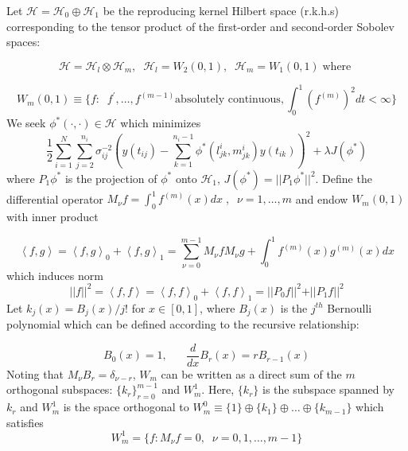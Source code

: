 \documentclass[12pt]{article}
\theoremstyle{definition}
\begin{document}
Let $\mathcal{H} = \mathcal{H}_{0} \oplus \mathcal{H}_{1}$ be the reproducing kernel Hilbert space (r.k.h.s) corresponding to the tensor product of the first-order and second-order Sobolev spaces:

\[
\mathcal{H} = \mathcal{H}_{l} \otimes \mathcal{H}_{m}, \;\; \mathcal{H}_{l} = W_2\left(0,1\right),\;\;\mathcal{H}_{m} = W_1\left(0,1\right)\;\mbox{where }
\]

\[W_m\left(0,1\right) \equiv \lbrace f: \;\;f^\prime, \dots, f^{\left( m-1 \right)} \mbox{absolutely continuous}, \int_0^1 \left(f^{\left( m \right)}\right)^2 dt < \infty \rbrace\]
\noindent
We seek $\phi^*\left(\cdot, \cdot \right) \in \mathcal{H}$ which minimizes
\begin{equation}
\frac{1}{2}\sum_{i=1}^N \sum_{j=2}^{n_i} {\sigma^{-2}_{ij}}\left( y\left(t_{ij}\right) - \sum_{k=1}^{n_i - 1}\phi^*\left(l^i_{jk},m^i_{jk} \right)y\left(t_{ik}\right) \right)^2 + \lambda J\left(\phi^*\right)  
\label{eq:objectivefun}
\end{equation}
\noindent
where $P_1 \phi^*$ is the projection of $\phi^*$ onto $\mathcal{H}_1$, $J\left(\phi^*\right) = \vert \vert P_1 \phi^* \vert \vert^2$. Define the differential operator $M_\nu f = \int_0^1 f^{\left( m \right)}\left(x\right) dx\;,\;\; \nu = 1, \dots, m$ and endow $W_m\left(0,1\right)$ with inner product

\begin{equation}
\left< f,g\right> = \left< f,g\right>_0 + \left< f,g\right>_1 = \sum_{\nu=0}^{m-1} M_\nu f M_\nu g + \int_0^1 f^{\left( m \right)}\left(x\right)g^{\left( m \right)}\left(x\right)dx
\end{equation}
\noindent
which induces norm 
\[
\vert \vert f \vert \vert^2 = \left< f,f\right> = \left< f,f\right>_0 + \left< f,f\right>_1 = \vert \vert P_0 f \vert \vert^2 + \vert \vert P_1 f \vert \vert^2
\]
\noindent
Let $k_j\left(x\right) = B_j\left(x\right)/{j!}$ for $x \in \left[0,1\right]$, where $B_j\left(x\right)$ is the $j^{th}$ Bernoulli polynomial which can be defined according to the recursive relationship:

\[
B_0\left(x\right) = 1,\;\;\;\;\;\; \frac{d}{dx} B_r\left(x\right) = rB_{r-1}\left(x\right)
\]
\noindent
Noting that $M_\nu B_r = \delta_{\nu-r}$, $W_m$ can be written as a direct sum of the $m$ orthogonal subspaces: $\lbrace k_r \rbrace_{r=0}^{m-1}$ and $W_m^1$.   Here, $\lbrace k_r \rbrace$ is the subspace spanned by $k_r$ and $W_m^1$ is the space orthogonal to $W_m^0 \equiv \lbrace 1 \rbrace \oplus \lbrace k_1 \rbrace \oplus \dots \oplus \lbrace k_{m-1} \rbrace$ which satisfies 
\[
W_m^1 = \lbrace f: M_\nu f = 0,\;\; \nu = 0,1,\dots, m-1\rbrace
\]
\end{document}
